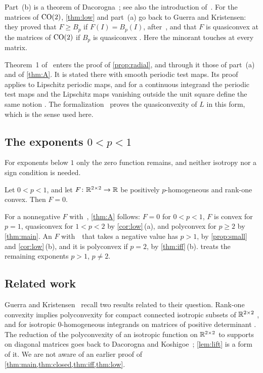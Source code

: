 Part~(b) is a theorem of Dacorogna~\cite{Dacorogna1995}; see also the introduction
of~\cite{DacorognaHaeberly1996}. For the matrices of $\mathrm{CO}(2)$, \cref{thm:low} and part~(a) go back
to Guerra and Kristensen: they proved that $F\ge B_p$ if $F(I)=B_p(I)$, after~\cite{AIPS2015},
and that $F$ is quasiconvex at the matrices of $\mathrm{CO}(2)$ if $B_p$ is quasiconvex
\cite[Theorems~4.2 and~1.2]{GuerraKristensen2022}. Here the minorant touches at every matrix.

Theorem~1 of~\cite{SharpHI} enters the proof of \cref{prop:radial}, and through it those of
part~(a) and of \cref{thm:A}. It is stated there with smooth periodic test maps. Its proof
applies to Lipschitz periodic maps, and for a continuous integrand the periodic test maps and the
Lipschitz maps vanishing outside the unit square define the same notion
\cite[Proposition~5.13]{Dacorogna2008}. The formalization~\cite{IwaniecLean} proves the
quasiconvexity of $L$ in this form, which is the sense used here.

\subsection{The exponents \texorpdfstring{$0<p<1$}{0 < p < 1}}\label{sec:intro-small}

For exponents below $1$ only the zero function remains, and neither isotropy nor a sign
condition is needed.

\begin{proposition}\label{prop:small}
Let $0<p<1$, and let $F\colon\mathbb{R}^{2\times 2}\to\mathbb{R}$ be positively $p$-homogeneous and rank-one convex. Then
$F=0$.
\end{proposition}

For a nonnegative $F$ with~\Hyp, \cref{thm:A} follows: $F=0$ for $0<p<1$, $F$ is convex for
$p=1$, quasiconvex for $1<p<2$ by \cref{cor:low}\,(a), and polyconvex for $p\ge2$ by
\cref{thm:main}. An $F$ with~\Hyp\ that takes a negative value has $p>1$, by
\cref{prop:small} and \cref{cor:low}\,(b), and it is polyconvex if $p=2$, by
\cref{thm:iff}\,(b).  treats the remaining exponents $p>1$, $p\ne2$.

\subsection{Related work}\label{sec:intro-related}

Guerra and Kristensen~\cite{GuerraKristensen2022} recall two results related to their question.
Rank-one convexity implies polyconvexity for compact connected isotropic subsets of $\mathbb{R}^{2\times 2}$
\cite{CardaliaguetTahraoui2002a,CardaliaguetTahraoui2002b,ContiDeLellisMuellerRomeo2003}, and for
isotropic $0$-homogeneous integrands on matrices of positive determinant
\cite{MartinGhibaNeff2017}. The reduction of the polyconvexity of an isotropic function on $\mathbb{R}^{2\times 2}$
to supports on diagonal matrices goes back to Dacorogna and
Koshigoe~\cite[Theorem~2.1]{DacorognaKoshigoe1993}; \cref{lem:lift} is a form of it. We are not
aware of an earlier proof of \cref{thm:main,thm:closed,thm:iff,thm:low}.

